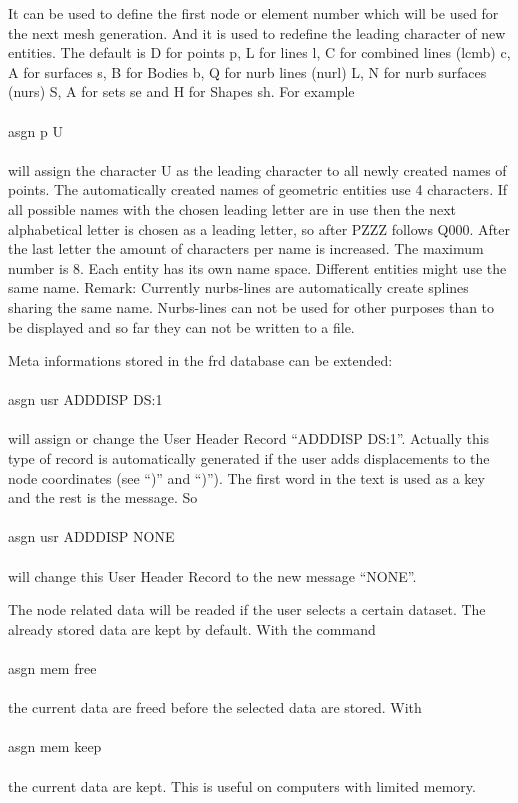 \documentclass{article}
\begin{document}
It can be used to define the first node or element number which will be used for the next mesh generation. And it is used to redefine the leading character of new entities. The default is D for points p, L for lines l, C for combined lines (lcmb) c, A for surfaces s, B for Bodies b, Q for nurb lines (nurl) L, N for nurb surfaces (nurs) S, A for sets se and H for Shapes sh. For example\\\\asgn p U\\\\will assign the character U as the leading character to all newly created names of points. The automatically created names of geometric entities use 4 characters. If all possible names with the chosen leading letter are in use then the next alphabetical letter is chosen as a leading letter, so after PZZZ follows Q000. After the last letter the amount of characters per name is increased. The maximum number is 8. Each entity has its own name space. Different entities might use the same name. Remark: Currently nurbs-lines are automatically create splines sharing the same name. Nurbs-lines can not be used for other purposes than to be displayed and so far they can not be written to a file.

Meta informations stored in the frd database can be extended:\\\\asgn usr ADDDISP DS:1\\\\will assign or change the User Header Record ``ADDDISP DS:1''. Actually this type of record is automatically generated if the user adds displacements to the node coordinates (see ``)'' and ``)''). The first word in the text is used as a key and the rest is the message. So \\\\asgn usr ADDDISP NONE\\\\will change this User Header Record to the new message ``NONE''.

The node related data will be readed if the user selects a certain dataset. The already stored data are kept by default. With the command\\\\asgn mem free\\\\the current data are freed before the selected data are stored. With \\\\asgn mem keep\\\\the current data are kept. This is useful on computers with limited memory.
\end{document}
